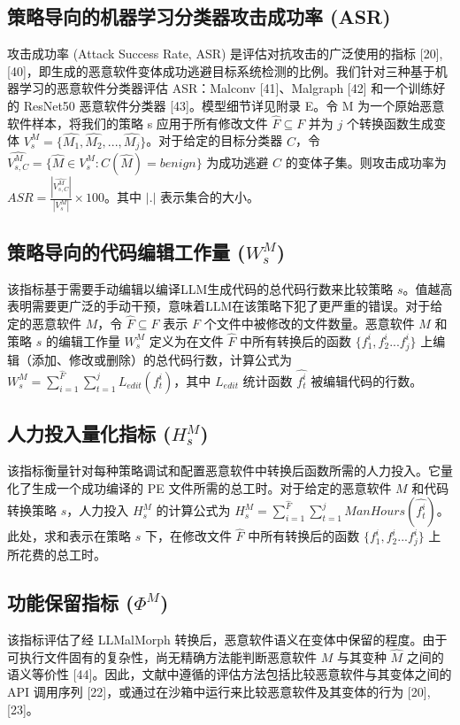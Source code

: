 \subsection{策略导向的机器学习分类器攻击成功率 (ASR)}
攻击成功率 (Attack Success Rate, ASR) 是评估对抗攻击的广泛使用的指标 [20], [40]，即生成的恶意软件变体成功逃避目标系统检测的比例。我们针对三种基于机器学习的恶意软件分类器评估 ASR：Malconv [41]、Malgraph [42] 和一个训练好的 ResNet50 恶意软件分类器 [43]。模型细节详见附录 E。令 M 为一个原始恶意软件样本，将我们的策略 s 应用于所有修改文件 $\hat{F} \subseteq F$ 并为 $j$ 个转换函数生成变体 $V_{s}^{M} = \{\hat{M_{1}}, \hat{M_{2}}, ..., \hat{M_{j}}\}$。对于给定的目标分类器 $C$，令 $\hat{V_{s,C}^{M}} = \{ \hat{M} \in V_{s}^{M} : C(\hat{M}) = benign\}$ 为成功逃避 $C$ 的变体子集。则攻击成功率为 $ASR = \frac{|\hat{V_{s,C}^{M}}|}{|V_{s}^{M}|} \times 100$。其中 $|.|$ 表示集合的大小。

\subsection{策略导向的代码编辑工作量 ($W_{s}^{M}$)}
该指标基于需要手动编辑以编译LLM生成代码的总代码行数来比较策略 $s$。值越高表明需要更广泛的手动干预，意味着LLM在该策略下犯了更严重的错误。对于给定的恶意软件 $M$，令 $\hat{F} \subseteq F$ 表示 $F$ 个文件中被修改的文件数量。恶意软件 $M$ 和策略 $s$ 的编辑工作量 $W_s^{M}$ 定义为在文件 $\hat{F}$ 中所有转换后的函数 $\{f_{1}^{i}, f_{2}^{i}... f_{j}^{i}\}$ 上编辑（添加、修改或删除）的总代码行数，计算公式为 $W_{s}^{M}=\sum_{i=1}^{\hat{F}} \sum_{t=1}^{j} L_{edit}(f_{t}^{i})$，其中 $L_{edit}$ 统计函数 $\hat{f_{t}^{i}}$ 被编辑代码的行数。

\subsection{人力投入量化指标 ($H_{s}^{M}$)}
该指标衡量针对每种策略调试和配置恶意软件中转换后函数所需的人力投入。它量化了生成一个成功编译的 PE 文件所需的总工时。对于给定的恶意软件 $M$ 和代码转换策略 $s$，人力投入 $H_{s}^{M}$ 的计算公式为 $H_{s}^{M} = \sum_{i=1}^{\hat{F}} \sum_{t=1}^{j} ManHours(\hat{f_{t}^{i}})$。此处，求和表示在策略 $s$ 下，在修改文件 $\hat{F}$ 中所有转换后的函数 $\{f_{1}^{i},f_{2}^{i}...f_{j}^{i}\}$ 上所花费的总工时。

\subsection{功能保留指标 ($\Phi^{M}$)}
该指标评估了经 LLMalMorph 转换后，恶意软件语义在变体中保留的程度。由于可执行文件固有的复杂性，尚无精确方法能判断恶意软件 $M$ 与其变种 $\hat{M}$ 之间的语义等价性 [44]。因此，文献中遵循的评估方法包括比较恶意软件与其变体之间的 API 调用序列 [22]，或通过在沙箱中运行来比较恶意软件及其变体的行为 [20], [23]。


